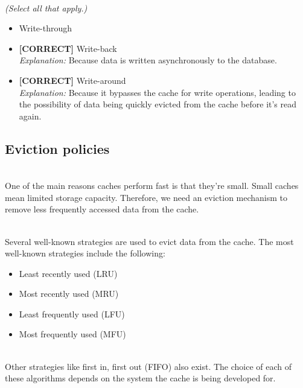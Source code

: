 \\
\textit{(Select all that apply.)}
\\[0.2cm]
\begin{itemize}
 \item Write-through
 \item \textbf{[CORRECT]} Write-back
\\[0.1cm]
\textit{Explanation:} 
Because data is written asynchronously to the database.
 \item \textbf{[CORRECT]} Write-around
\\[0.1cm]
\textit{Explanation:} 
Because it bypasses the cache for write operations, leading to the possibility of data being quickly evicted from the cache before it's read again.
\end{itemize}

\subsection{Eviction policies}\label{-Y0s22qyaH2PfjjxqlSPL}
\\
One of the main reasons caches perform fast is that they're small. Small caches mean limited storage capacity. Therefore, we need an eviction mechanism to remove less frequently accessed data from the cache.\\
\strut \\
Several well-known strategies are used to evict data from the cache. The most well-known strategies include the following:

\begin{itemize}
\item
\protect{}\label{ySX_074h-xgqRlE7E6pKH}
Least recently used (LRU)
\item
\protect{}\label{dibt4_qtOXs62av3JSIMm}
Most recently used (MRU)
\item
\protect{}\label{qOR22YXehr7upRcZQOUHL}
Least frequently used (LFU)
\item
\protect{}\label{iF9dLR_SjNDWvamO1THVM}
Most frequently used (MFU)
\end{itemize}
\\
Other strategies like first in, first out (FIFO) also exist. The choice of each of these algorithms depends on the system the cache is being developed for.

